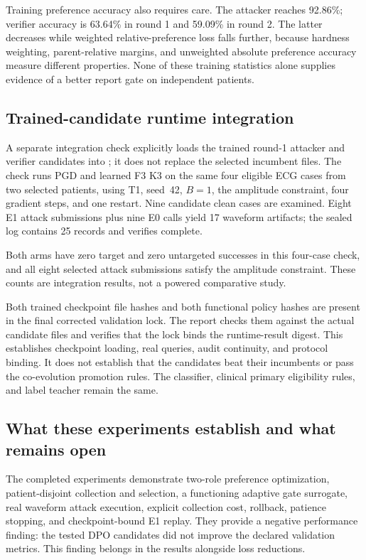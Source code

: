 Training preference accuracy also requires care. The attacker reaches 92.86\%; verifier accuracy is 63.64\% in round 1 and 59.09\% in round 2. The latter decreases while weighted relative-preference loss falls further, because hardness weighting, parent-relative margins, and unweighted absolute preference accuracy measure different properties. None of these training statistics alone supplies evidence of a better report gate on independent patients.

\subsection{Trained-candidate runtime integration}
A separate integration check explicitly loads the trained round-1 attacker and verifier candidates into ; it does not replace the selected incumbent files. The check runs PGD and learned F3 K3 on the same four eligible ECG cases from two selected patients, using T1, seed~42, $B=1$, the amplitude constraint, four gradient steps, and one restart. Nine candidate clean cases are examined. Eight E1 attack submissions plus nine E0 calls yield 17 waveform artifacts; the sealed log contains 25 records and verifies complete.

Both arms have zero target and zero untargeted successes in this four-case check, and all eight selected attack submissions satisfy the amplitude constraint. These counts are integration results, not a powered comparative study.\par

Both trained checkpoint file hashes and both functional policy hashes are present in the final corrected validation lock. The report checks them against the actual candidate files and verifies that the lock binds the runtime-result digest. This establishes checkpoint loading, real queries, audit continuity, and protocol binding. It does not establish that the candidates beat their incumbents or pass the co-evolution promotion rules. The classifier, clinical primary eligibility rules, and label teacher remain the same.

\subsection{What these experiments establish and what remains open}
The completed experiments demonstrate two-role preference optimization, patient-disjoint collection and selection, a functioning adaptive gate surrogate, real waveform attack execution, explicit collection cost, rollback, patience stopping, and checkpoint-bound E1 replay. They provide a negative performance finding: the tested DPO candidates did not improve the declared validation metrics. This finding belongs in the results alongside loss reductions.

